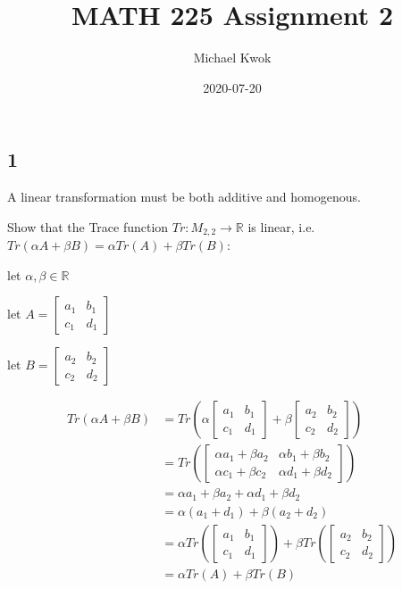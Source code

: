 \documentclass{article}
\title{MATH 225 Assignment 2}
\author{Michael Kwok}
\date{2020-07-20}
\begin{document}
\maketitle
\subsection*{1}
A linear transformation must be both additive and homogenous.

Show that the Trace function $Tr : M_{2,2} \rightarrow \mathbb{R}$ is linear, i.e. $Tr(\alpha A + \beta B) = \alpha Tr(A) + \beta Tr(B)$:

let $\alpha, \beta \in \mathbb{R}$

let $A = \begin{bmatrix}
a_1 & b_1\\
c_1 & d_1
\end{bmatrix}$

let $B = \begin{bmatrix}
a_2 & b_2\\
c_2 & d_2
\end{bmatrix}$

\begin{align*}
Tr(\alpha A + \beta B) &= Tr\left(\alpha \begin{bmatrix}
a_1 & b_1\\
c_1 & d_1
\end{bmatrix} + \beta \begin{bmatrix}
a_2 & b_2\\
c_2 & d_2
\end{bmatrix} \right)\\ 
&= Tr\left( \begin{bmatrix}
\alpha a_1 + \beta a_2 & \alpha b_1 + \beta b_2\\
\alpha c_1 + \beta c_2 & \alpha d_1 + \beta d_2
\end{bmatrix} \right)\\
&= \alpha a_1 + \beta a_2 + \alpha d_1 + \beta d_2\\
&= \alpha (a_1 + d_1) + \beta (a_2  + d_2)\\
&= \alpha Tr\left(\begin{bmatrix}
a_1 & b_1\\
c_1 & d_1
\end{bmatrix}\right) + \beta Tr\left(\begin{bmatrix}
a_2 & b_2\\
c_2 & d_2
\end{bmatrix}\right)\\
&= \alpha Tr(A) + \beta Tr(B)
\end{align*}
\end{document}
